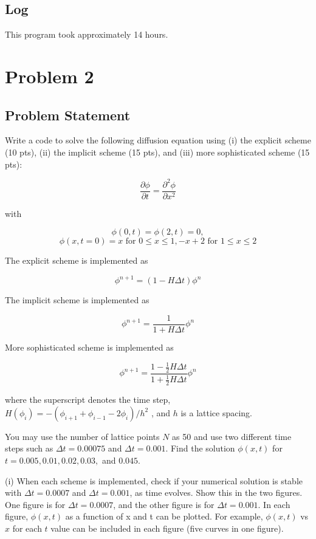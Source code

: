 \documentclass[10pt,letter]{article}
\begin{document}
\subsection{Log}

This program took approximately 14 hours.

\pagebreak

\section{Problem 2}

\subsection{Problem Statement}


Write a code to solve the following diffusion equation using (i) the explicit scheme (10 pts), (ii) the
implicit scheme (15 pts), and (iii) more sophisticated scheme (15 pts):

$$ \frac{\partial \phi}{\partial t} = \frac{\partial^2 \phi}{\partial x^2}$$

with

$$\phi(0,t) = \phi(2, t) = 0,$$
$$\phi(x,t=0) = x \text{ for } 0 \le x \le 1, -x+2 \text{ for } 1\le x \le 2$$

The explicit scheme is implemented as

$$\phi^{n+1} = (1-H\Delta t)\phi^n $$

The implicit scheme is implemented as

$$\phi^{n+1} =\frac{1}{1+H\Delta t} \phi^n$$

More sophisticated scheme is implemented as

$$\phi^{n+1} =\frac{1-\frac{1}{2}H\Delta t}{1+\frac{1}{2}H\Delta t} \phi^n$$

where the superscript denotes the time step, $H(\phi_i) = -(\phi_{i+1} + \phi_{i-1} - 2\phi_i)/h^2$
, and $h$ is a lattice spacing.

You may use the number of lattice points $N$ as 50 and use two different time steps such as $\Delta t=0.00075$
and $\Delta t=0.001$. Find the solution $\phi(x, t)$ for $t=0.005, 0.01, 0.02, 0.03,$ and $0.045$.

(i) When each scheme is implemented, check if your numerical solution is stable with $\Delta t=0.0007$
and $\Delta t=0.001$, as time evolves. Show this in the two figures. One figure is for $\Delta t=0.0007$, and
the other figure is for $\Delta t=0.001$. In each figure, $\phi(x, t)$ as a function of x and t can be plotted.
For example, $\phi(x, t)$ vs $x$ for each $t$ value can be included in each figure (five curves in one
figure).
\end{document}
